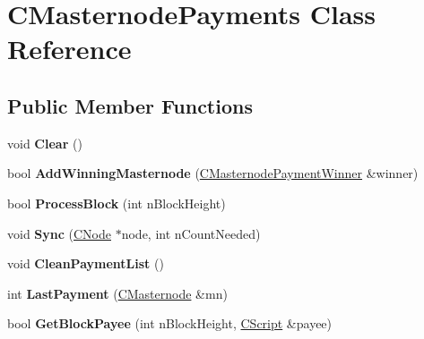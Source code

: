 \hypertarget{class_c_masternode_payments}{}\section{C\+Masternode\+Payments Class Reference}
\label{class_c_masternode_payments}
\subsection*{Public Member Functions}
\begin{DoxyCompactItemize}
\item 
\mbox{\label{class_c_masternode_payments_ace5711bd6c2b17cd1e35e0924aae4268}} 
void {\bfseries Clear} ()
\item 
\mbox{\label{class_c_masternode_payments_a0812cd761893ca4fc5b1131fc535115c}} 
bool {\bfseries Add\+Winning\+Masternode} (\mbox{\hyperlink{class_c_masternode_payment_winner}{C\+Masternode\+Payment\+Winner}} \&winner)
\item 
\mbox{\label{class_c_masternode_payments_aa23dfbc148f10f601e9771bfcffea441}} 
bool {\bfseries Process\+Block} (int n\+Block\+Height)
\item 
\mbox{\label{class_c_masternode_payments_a7363554e7f7a23a718e2b50980c7516f}} 
void {\bfseries Sync} (\mbox{\hyperlink{class_c_node}{C\+Node}} $\ast$node, int n\+Count\+Needed)
\item 
\mbox{\label{class_c_masternode_payments_a386648607692fe65b9a42c0692da033d}} 
void {\bfseries Clean\+Payment\+List} ()
\item 
\mbox{\label{class_c_masternode_payments_a69ca0e611580d8ca03793cb4340e23c0}} 
int {\bfseries Last\+Payment} (\mbox{\hyperlink{class_c_masternode}{C\+Masternode}} \&mn)
\item 
\mbox{\label{class_c_masternode_payments_a23ced53f72a503a71bbe6be8d472ecfd}} 
bool {\bfseries Get\+Block\+Payee} (int n\+Block\+Height, \mbox{\hyperlink{class_c_script}{C\+Script}} \&payee)
\item 

\end{DoxyCompactItemize}
